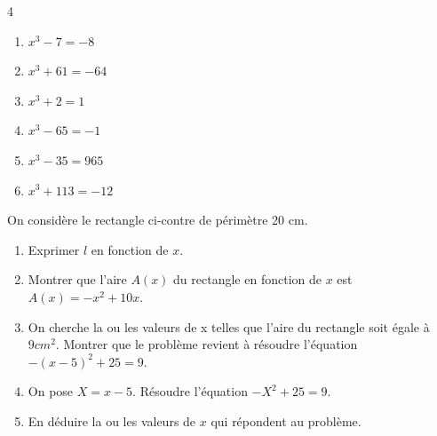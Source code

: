 {\begin{Exercice}
\begin{multicols}{4}
\begin{enumerate}[itemsep=1em]
	
	\item \begin{minipage}[t]{\linewidth}$x^3-7=-8$\\\end{minipage}
	\item \begin{minipage}[t]{\linewidth}$x^3+61=-64$\\\end{minipage}
	\item \begin{minipage}[t]{\linewidth}$x^3+2=1$\\\end{minipage}
	\item \begin{minipage}[t]{\linewidth}$x^3-65=-1$\\\end{minipage}
	\item \begin{minipage}[t]{\linewidth}$x^3-35=965$\\\end{minipage}
	\item \begin{minipage}[t]{\linewidth}$x^3+113=-12$\\\end{minipage}
\end{enumerate}
\end{multicols}
\end{Exercice}

\begin{Exercice}

On considère le rectangle ci-contre de périmètre 20 cm.\\
\begin{center}
\end{center}
\begin{enumerate}
\item Exprimer $ l $ en fonction de $ x $.
\item Montrer que l'aire $ A(x) $ du rectangle en fonction de $ x $ est $ A(x)=-x^2+10x $.
\item On cherche la ou les valeurs de x telles que l'aire du rectangle soit égale à $ 9 cm^2 $.
Montrer que le problème revient à résoudre l'équation
$ -(x-5)^2 +25 = 9 $.
\item On pose $ X = x - 5 $.
Résoudre l'équation $ -X^2 + 25 = 9 $.
\item En déduire la ou les valeurs de $ x $ qui répondent au problème.
\end{enumerate}


\end{Exercice}}

